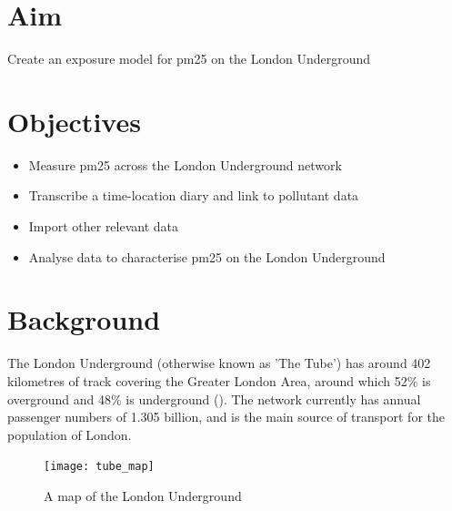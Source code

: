\section{Aim}
\label{sec:3aim}

Create an exposure model for \gls{pm25} on the London Underground

\section{Objectives}
\label{sec:3objectives}

\begin{itemize}
\item Measure \gls{pm25} across the London Underground network
\item Transcribe a time-location diary and link to pollutant data
\item Import other relevant data
\item Analyse data to characterise \gls{pm25} on the London Underground
\end{itemize}

\section{Background}
\label{sec:3background}

The London Underground (otherwise known as 'The Tube') has around 402 kilometres of track covering the Greater London Area, around which 52\% is overground and 48\% is underground (\cite{TransportforLondon2014a}). The network currently has annual passenger numbers of 1.305 billion, and is the main source of transport for the population of London. 

\begin{figure}[H]
\centering
\texttt{[image: tube\_map]}
\caption{A map of the London Underground}
\label{fig:tube_map}
\end{figure}

